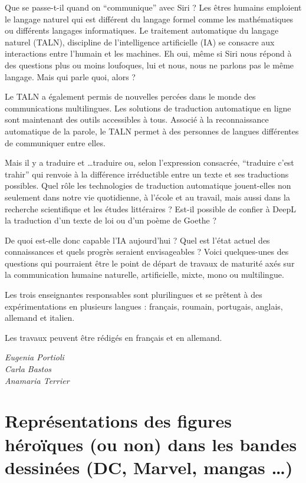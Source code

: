 \documentclass[
  10pt,
  french,
  a5paper,
  openany]{book}
\newenvironment{signature}{\begin{flushright}}{\end{flushright}}
\begin{document}
Que se passe-t-il quand on ``communique'' avec Siri ? Les êtres humains emploient le langage naturel qui est différent du langage formel comme les mathématiques ou différents langages informatiques. Le traitement automatique du langage naturel (TALN), discipline de l'intelligence artificielle (IA) se consacre aux interactions entre l'humain et les machines. Eh oui, même si Siri nous répond à des questions plus ou moins loufoques, lui et nous, nous ne parlons pas le même langage. Mais qui parle quoi, alors ?

Le TALN a également permis de nouvelles percées dans le monde des communications multilingues. Les solutions de traduction automatique en ligne sont maintenant des outils accessibles à tous. Associé à la reconnaissance automatique de la parole, le TALN permet à des personnes de langues différentes de communiquer entre elles.

Mais il y a traduire et \ldots traduire ou, selon l'expression consacrée, ``traduire c'est trahir'' qui renvoie à la différence irréductible entre un texte et ses traductions possibles. Quel rôle les technologies de traduction automatique jouent-elles non seulement dans notre vie quotidienne, à l'école et au travail, mais aussi dans la recherche scientifique et les études littéraires ? Est-il possible de confier à DeepL la traduction d'un texte de loi ou d'un poème de Goethe ?

De quoi est-elle donc capable l'IA aujourd'hui ? Quel est l'état actuel des connaissances et quels progrès seraient envisageables ? Voici quelques-unes des questions qui pourraient être le point de départ de travaux de maturité axés sur la communication humaine naturelle, artificielle, mixte, mono ou multilingue.

Les trois enseignantes responsables sont plurilingues et se prêtent à des expérimentations en plusieurs langues : français, roumain, portugais, anglais, allemand et italien.

Les travaux peuvent être rédigés en français et en allemand.

\begin{signature}
\emph{Eugenia Portioli}\\
\emph{Carla Bastos}\\
\emph{Anamaria Terrier}

\end{signature}

\hypertarget{repruxe9sentations-des-figures-huxe9rouxefques-ou-non-dans-les-bandes-dessinuxe9es-dc-marvel-mangas}{%
\chapter{\texorpdfstring{Représentations des figures héroïques \linebreak (ou non) dans les bandes dessinées \linebreak (DC, Marvel, mangas \ldots)}{Représentations des figures héroïques (ou non) dans les bandes dessinées (DC, Marvel, mangas \ldots)}}\label{repruxe9sentations-des-figures-huxe9rouxefques-ou-non-dans-les-bandes-dessinuxe9es-dc-marvel-mangas}}
\end{document}
